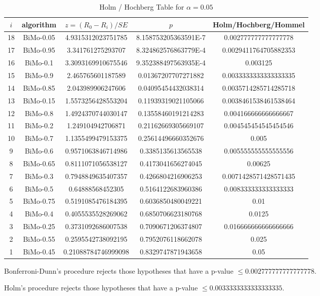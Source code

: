 \documentclass[a4paper,10pt]{article}
\begin{document}
\begin{landscape}
\begin{table}[!htp]
\centering\tiny
\caption{Holm / Hochberg Table for $\alpha=0.05$}
\begin{tabular}{ccccc}
$i$&algorithm&$z=(R_0 - R_i)/SE$&$p$&Holm/Hochberg/Hommel\\
\hline
18&BiMo-0.05&4.9315312023751785&8.158753205363591E-7&0.002777777777777778\\
17&BiMo-0.95&3.341761275293707&8.324862576863779E-4&0.0029411764705882353\\
16&BiMo-0.1&3.3093169910675546&9.352388497563935E-4&0.003125\\
15&BiMo-0.9&2.465765601187589&0.01367207707271882&0.0033333333333333335\\
14&BiMo-0.85&2.043989906247606&0.04095454432038314&0.0035714285714285718\\
13&BiMo-0.15&1.5573256428553204&0.11939319021105066&0.0038461538461538464\\
12&BiMo-0.8&1.4924370744030147&0.13558460191214283&0.004166666666666667\\
11&BiMo-0.2&1.249104942706871&0.21162669305669107&0.004545454545454546\\
10&BiMo-0.7&1.1355499479153375&0.25614496660352676&0.005\\
9&BiMo-0.6&0.9571063846714986&0.3385135613565538&0.005555555555555556\\
8&BiMo-0.65&0.8111071056538127&0.4173041656274045&0.00625\\
7&BiMo-0.3&0.7948849635407357&0.4266804216906253&0.0071428571428571435\\
6&BiMo-0.5&0.64888568452305&0.5164122683960386&0.008333333333333333\\
5&BiMo-0.75&0.5191085476184395&0.6036850480049221&0.01\\
4&BiMo-0.4&0.4055535528269062&0.6850706623180768&0.0125\\
3&BiMo-0.25&0.3731092686007538&0.7090671206374807&0.016666666666666666\\
2&BiMo-0.55&0.2595542738092195&0.7952076118662078&0.025\\
1&BiMo-0.45&0.21088784746999098&0.8329747871943658&0.05\\
\hline
\end{tabular}
\end{table}
Bonferroni-Dunn's procedure rejects those hypotheses that have a p-value $\le0.002777777777777778$.


Holm's procedure rejects those hypotheses that have a p-value $\le0.0033333333333333335$.



\end{landscape}
\end{document}

